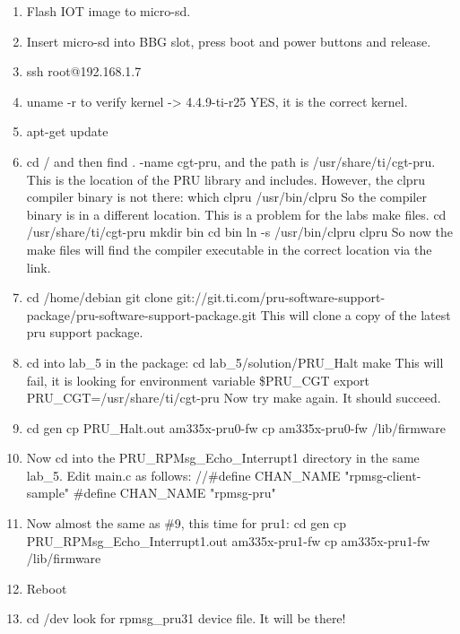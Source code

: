 \begin{enumerate}
\item Flash IOT image to micro-sd.
\item  Insert micro-sd into BBG slot, press boot and power buttons and release.
\item  ssh root@192.168.1.7
\item  uname -r to verify kernel -> 4.4.9-ti-r25  YES, it is the correct kernel.
\item  apt-get update
\item  cd / and then find . -name cgt-pru, and the path is /usr/share/ti/cgt-pru.  This is the location of the PRU library and includes.
However, the clpru compiler binary is not there:
which clpru
/usr/bin/clpru
So the compiler binary is in a different location.  This is a problem for the labs make files.
cd /usr/share/ti/cgt-pru
mkdir bin
cd bin
ln -s /usr/bin/clpru clpru
So now the make files will find the compiler executable in the correct location via the link.
\item  cd /home/debian
git clone git://git.ti.com/pru-software-support-package/pru-software-support-package.git
This will clone a copy of the latest pru support package.
\item  cd into lab\_5 in the package:
cd lab\_5/solution/PRU\_Halt
make
This will fail, it is looking for environment variable \$PRU\_CGT
export PRU\_CGT=/usr/share/ti/cgt-pru
Now try make again.  It should succeed.
\item  cd gen
cp PRU\_Halt.out am335x-pru0-fw
cp am335x-pru0-fw /lib/firmware
\item  Now cd into the PRU\_RPMsg\_Echo\_Interrupt1 directory in the same lab\_5.
Edit main.c as follows:
//\#define CHAN\_NAME					"rpmsg-client-sample"
\#define CHAN\_NAME					"rpmsg-pru"
\item  Now almost the same as \#9, this time for pru1:
cd gen
cp PRU\_RPMsg\_Echo\_Interrupt1.out am335x-pru1-fw
cp am335x-pru1-fw /lib/firmware
\item  Reboot
\item  cd /dev look for rpmsg\_pru31 device file.  It will be there!
\end{enumerate}


